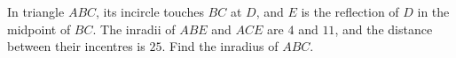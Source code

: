In triangle $ABC$, its incircle touches $BC$ at $D$, and $E$ is the reflection of $D$ in the midpoint of $BC$. The inradii of $ABE$ and $ACE$ are $4$ and $11$, and the distance between their incentres is $25$. Find the inradius of $ABC$.
